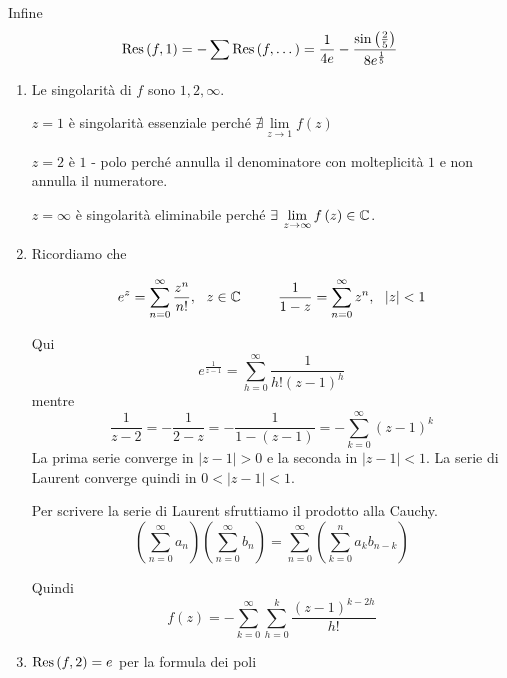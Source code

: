 Infine
\begin{equation*}
\operatorname{Res} \left(f,1\right) = - \sum \operatorname{Res} \left(f,\dotsc \right) = \frac{1}{4e} - \frac{\sin\left(\frac{2}{5}\right)}{8e^{\frac{1}{5}}}
\end{equation*}
\Soluzione
\begin{enumerate}
\item Le singolarità di $f$ sono $1,2,\infty $.

$z = 1$ è singolarità essenziale perché $\nexists \lim\limits _{z\rightarrow 1} f\left(z\right)$

$z = 2$ è $1$ - polo perché annulla il denominatore con molteplicità $1$ e non annulla il numeratore.

$z = \infty $ è singolarità eliminabile perché $\exists \lim\limits _{z\rightarrow \infty } f\left(z\right) \in \CC $.
\item Ricordiamo che

\begin{rem}
\begin{equation*}
e^{z} = \sum\limits ^{\infty }_{n = 0}\frac{z^{n}}{n!} ,\ \ z\in \mathbb{C}  \ \ \ \ \ \ \ \ \frac{1}{1 - z} = \sum\limits ^{\infty }_{n = 0} z^{n} ,\ \ \left| z\right| < 1
\end{equation*}
\end{rem}

Qui\begin{equation*}
e^{\frac{1}{z - 1}} = \sum\limits ^{\infty }_{h = 0}\frac{1}{h!\left(z - 1\right)^{h}}
\end{equation*}mentre\begin{equation*}
\frac{1}{z - 2} = - \frac{1}{2 - z} = - \frac{1}{1 - \left(z - 1\right)} = - \sum\limits ^{\infty }_{k = 0}\left(z - 1\right)^{k}
\end{equation*}La prima serie converge in $\left| z - 1\right|  > 0$ e la seconda in $\left| z - 1\right| < 1$. La serie di Laurent converge quindi in $0 < \left| z - 1\right| < 1$.\begin{rem}
Per scrivere la serie di Laurent sfruttiamo il prodotto alla Cauchy.
\begin{equation*}
\left(\sum\limits ^{\infty }_{n = 0} a_{n}\right)\left(\sum\limits ^{\infty }_{n = 0} b_{n}\right) = \sum\limits ^{\infty }_{n = 0}\left(\sum\limits ^{n}_{k = 0} a_{k} b_{n - k}\right)
\end{equation*}
\end{rem}Quindi\begin{equation*}
f\left(z\right) = - \sum\limits ^{\infty }_{k = 0}\sum\limits ^{k}_{h = 0}\frac{\left(z - 1\right)^{k - 2h}}{h!}
\end{equation*}
\item $\operatorname{Res} \left(f,2\right) = e$ per la formula dei poli


\end{enumerate}
